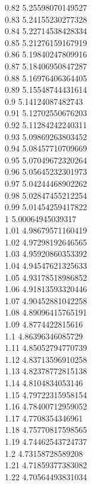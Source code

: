 {0.82	5.25598070149527\\
0.83	5.24155230277328\\
0.84	5.22714538428334\\
0.85	5.21276159167919\\
0.86	5.19840247809916\\
0.87	5.18406950847287\\
0.88	5.16976406364405\\
0.89	5.15548744431614\\
0.9	5.14124087482743\\
0.91	5.12702550676203\\
0.92	5.11284242240311\\
0.93	5.09869263803452\\
0.94	5.08457710709669\\
0.95	5.07049672320264\\
0.96	5.05645232301973\\
0.97	5.04244468902262\\
0.98	5.02847455212254\\
0.99	5.01454259417822\\
1	5.00064945039317\\
1.01	4.98679571160419\\
1.02	4.97298192646565\\
1.03	4.95920860353392\\
1.04	4.94547621325633\\
1.05	4.93178518986852\\
1.06	4.91813593320446\\
1.07	4.90452881042258\\
1.08	4.89096415765191\\
1.09	4.8774422815616\\
1.1	4.86396346085729\\
1.11	4.85052794770739\\
1.12	4.83713596910258\\
1.13	4.82378772815138\\
1.14	4.8104834053146\\
1.15	4.79722315958154\\
1.16	4.78400712959052\\
1.17	4.7708354346961\\
1.18	4.75770817598565\\
1.19	4.74462543724737\\
1.2	4.73158728589208\\
1.21	4.71859377383082\\
1.22	4.70564493831034\\
}

